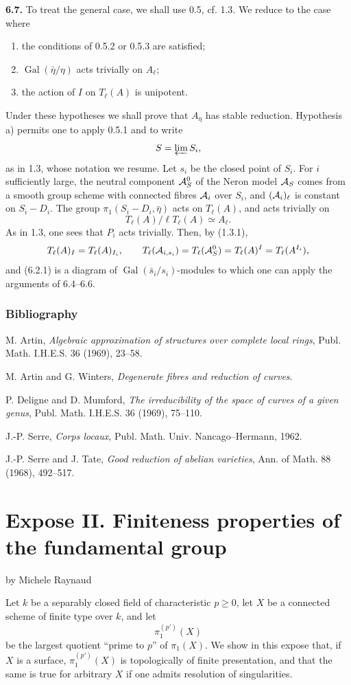 \documentclass[11pt]{article}
\providecommand{\Gal}{\operatorname{Gal}}
\providecommand{\limproj}{\varprojlim}
\begin{document}
\textbf{6.7.} To treat the general case, we shall use 0.5, cf. 1.3. We reduce to the case where
\begin{enumerate}[label=\alph*)]
\item the conditions of 0.5.2 or 0.5.3 are satisfied;
\item $\Gal(\bar\eta/\eta)$ acts trivially on $A_\ell$;
\item the action of $I$ on $T_\ell(A)$ is unipotent.
\end{enumerate}
Under these hypotheses we shall prove that $A_\eta$ has stable reduction. Hypothesis a) permits one to apply 0.5.1 and to write
\[
 S=\limproj S_i,
\]
as in 1.3, whose notation we resume. Let $s_i$ be the closed point of $S_i$. For $i$ sufficiently large, the neutral component $\mathcal A^0_S$ of the Neron model $\mathcal A_S$ comes from a smooth group scheme with connected fibres $\mathcal A_i$ over $S_i$, and $(\mathcal A_i)_\ell$ is constant on $S_i-D_i$. The group $\pi_1(S_i-D_i,\bar\eta)$ acts on $T_\ell(A)$, and acts trivially on
\[
 T_\ell(A)/\ell T_\ell(A)\simeq A_\ell.
\]
As in 1.3, one sees that $P_i$ acts trivially. Then, by (1.3.1),
\[
 T_\ell(A)_I=T_\ell(A)_{I_i},
 \qquad
 T_\ell(\mathcal A_{i,s_i})=T_\ell(\mathcal A^0_S)=T_\ell(A)^I=T_\ell(A^{I_i}),
\]
and (6.2.1) is a diagram of $\Gal(\bar s_i/s_i)$-modules to which one can apply the arguments of 6.4--6.6.

\subsubsection*{Bibliography}
\begin{enumerate}[label={[\arabic*]}]
\item M. Artin, \emph{Algebraic approximation of structures over complete local rings}, Publ. Math. I.H.E.S. 36 (1969), 23--58.
\item M. Artin and G. Winters, \emph{Degenerate fibres and reduction of curves}.
\item P. Deligne and D. Mumford, \emph{The irreducibility of the space of curves of a given genus}, Publ. Math. I.H.E.S. 36 (1969), 75--110.
\item J.-P. Serre, \emph{Corps locaux}, Publ. Math. Univ. Nancago--Hermann, 1962.
\item J.-P. Serre and J. Tate, \emph{Good reduction of abelian varieties}, Ann. of Math. 88 (1968), 492--517.
\end{enumerate}

\section*{Expose II. Finiteness properties of the fundamental group}
\begin{center}
by Michele Raynaud
\end{center}
Let $k$ be a separably closed field of characteristic $p\ge0$, let $X$ be a connected scheme of finite type over $k$, and let
\[
 \pi_1^{(p')}(X)
\]
be the largest quotient ``prime to $p$'' of $\pi_1(X)$. We show in this expose that, if $X$ is a surface, $\pi_1^{(p')}(X)$ is topologically of finite presentation, and that the same is true for arbitrary $X$ if one admits resolution of singularities.
\end{document}
